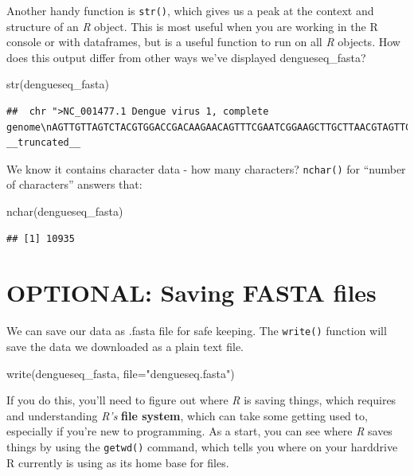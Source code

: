 \documentclass[
]{book}
\newenvironment{Shaded}{\begin{snugshade}}{\end{snugshade}}
\newcommand{\AttributeTok}[1]{\textcolor[rgb]{0.77,0.63,0.00}{#1}}
\newcommand{\FunctionTok}[1]{\textcolor[rgb]{0.00,0.00,0.00}{#1}}
\newcommand{\NormalTok}[1]{#1}
\newcommand{\StringTok}[1]{\textcolor[rgb]{0.31,0.60,0.02}{#1}}
\begin{document}
Another handy function is \texttt{str()}, which gives us a peak at the context and structure of an \emph{R} object. This is most useful when you are working in the R console or with dataframes, but is a useful function to run on all \emph{R} objects. How does this output differ from other ways we've displayed dengueseq\_fasta?

\begin{Shaded}
\begin{Highlighting}[]
\FunctionTok{str}\NormalTok{(dengueseq\_fasta)}
\end{Highlighting}
\end{Shaded}

\begin{verbatim}
##  chr ">NC_001477.1 Dengue virus 1, complete genome\nAGTTGTTAGTCTACGTGGACCGACAAGAACAGTTTCGAATCGGAAGCTTGCTTAACGTAGTTCTA"| __truncated__
\end{verbatim}

We know it contains character data - how many characters? \texttt{nchar()} for ``number of characters'' answers that:

\begin{Shaded}
\begin{Highlighting}[]
\FunctionTok{nchar}\NormalTok{(dengueseq\_fasta)}
\end{Highlighting}
\end{Shaded}

\begin{verbatim}
## [1] 10935
\end{verbatim}

\hypertarget{optional-saving-fasta-files}{%
\section{OPTIONAL: Saving FASTA files}\label{optional-saving-fasta-files}}

We can save our data as .fasta file for safe keeping. The \texttt{write()} function will save the data we downloaded as a plain text file.

\begin{Shaded}
\begin{Highlighting}[]
\FunctionTok{write}\NormalTok{(dengueseq\_fasta, }
      \AttributeTok{file=}\StringTok{"dengueseq.fasta"}\NormalTok{)}
\end{Highlighting}
\end{Shaded}

If you do this, you'll need to figure out where \emph{R} is saving things, which requires and understanding \emph{R's} \textbf{file system}, which can take some getting used to, especially if you're new to programming. As a start, you can see where \emph{R} saves things by using the \texttt{getwd()} command, which tells you where on your harddrive R currently is using as its home base for files.
\end{document}
